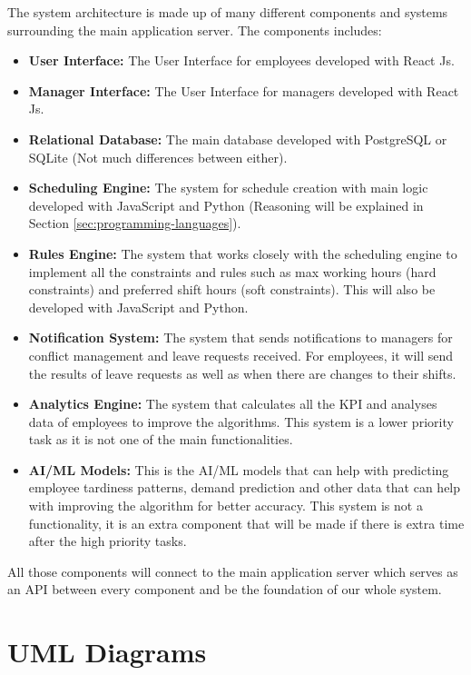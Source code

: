 \documentclass[a4paper,12pt, oneside]{report}
\begin{document}
The system architecture is made up of many different components and systems surrounding the main application server. The components includes:
\begin{itemize}
    \item {
    \textbf{User Interface: }The User Interface for employees developed with React Js. 
    }
    \item {
    \textbf{Manager Interface: }The User Interface for managers developed with React Js.
    }
    \item {
    \textbf{Relational Database: }The main database developed with PostgreSQL or SQLite (Not much differences between either).
    }
    \item {
    \textbf{Scheduling Engine: }The system for schedule creation with main logic developed with JavaScript and Python (Reasoning will be explained in Section \ref{sec:programming-languages}).
    }
    \item {
    \textbf{Rules Engine: } The system that works closely with the scheduling engine to implement all the constraints and rules such as max working hours (hard constraints) and preferred shift hours (soft constraints). This will also be developed with JavaScript and Python.
    }
    \item {
    \textbf{Notification System: }The system that sends notifications to managers for conflict management and leave requests received. For employees, it will send the results of leave requests as well as when there are changes to their shifts.
    }
    \item {
    \textbf{Analytics Engine: }The system that calculates all the KPI and analyses data of employees to improve the algorithms. This system is a lower priority task as it is not one of the main functionalities.
    }
    \item {
    \textbf{AI/ML Models: }This is the AI/ML models that can help with predicting employee tardiness patterns, demand prediction and other data that can help with improving the algorithm for better accuracy. This system is not a functionality, it is an extra component that will be made if there is extra time after the high priority tasks.
    }
\end{itemize}
All those components will connect to the main application server which serves as an API between every component and be the foundation of our whole system.\\

\section{UML Diagrams}
\end{document}
